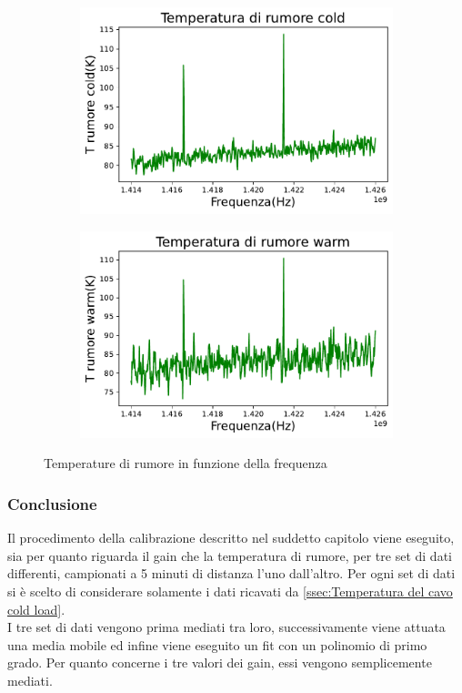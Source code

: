 \begin{figure}[H]
\centering

\begin{subfigure}[h!]{0.49\textwidth}
	\includegraphics[width=\textwidth]{Temperatura_rumore_cold.pdf}
    \label{fig:sub1}
\end{subfigure}
\hfill
\begin{subfigure}[h!]{0.49\textwidth}
    \includegraphics[width=\textwidth]{Temperatura_rumore_warm.pdf}
    \label{fig:sub2}
\end{subfigure}
\caption{Temperature di rumore in funzione della frequenza}
\end{figure}


\subsubsection{Conclusione}
\label{sssec:Conclusione}
Il procedimento della calibrazione descritto nel suddetto capitolo viene eseguito, sia per quanto riguarda il gain che la temperatura di rumore, per tre set di dati differenti, campionati a 5 minuti di distanza l'uno dall'altro. Per ogni set di dati si è scelto di considerare solamente i dati ricavati da \eqref{ssec:Temperatura del cavo cold load}.\\
I tre set di dati vengono prima mediati tra loro, successivamente viene attuata una media mobile ed infine viene eseguito un fit con un polinomio di primo grado. Per quanto concerne i tre valori dei gain, essi vengono semplicemente mediati. 

